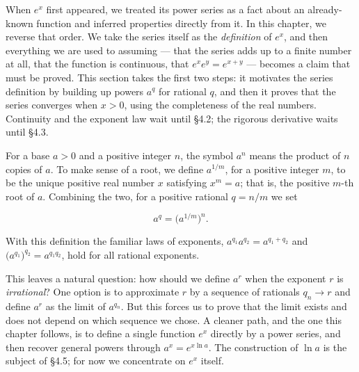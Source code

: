 \documentclass[a4paper,12pt,oneside]{memoir}
\begin{document}
When \(e^{x}\) first appeared, we treated its power series as a fact about an already-known function and inferred properties directly from it. In this chapter, we reverse that order. We take the series itself as the \emph{definition} of \(e^{x}\), and then everything we are used to assuming — that the series adds up to a finite number at all, that the function is continuous, that \(e^{x} e^{y} = e^{x + y}\) — becomes a claim that must be proved. This section takes the first two steps: it motivates the series definition by building up powers \(a^{q}\) for rational \(q\), and then it proves that the series converges when \(x > 0\), using the completeness of the real numbers. Continuity and the exponent law wait until §4.2; the rigorous derivative waits until §4.3.

For a base \(a > 0\) and a positive integer \(n\), the symbol \(a^{n}\) means the product of \(n\) copies of \(a\). To make sense of a root, we define \(a^{1/m}\), for a positive integer \(m\), to be the unique positive real number \(x\) satisfying \(x^{m} = a\); that is, the positive \(m\)-th root of \(a\). Combining the two, for a positive rational \(q = n/m\) we set

\[ a^{q} = \bigl(a^{1/m}\bigr)^{n}. \]

With this definition the familiar laws of exponents, \(a^{q_{1}} a^{q_{2}} = a^{q_{1} + q_{2}}\) and \(\bigl(a^{q_{1}}\bigr)^{q_{2}} = a^{q_{1} q_{2}}\), hold for all rational exponents.

This leaves a natural question: how should we define \(a^{r}\) when the exponent \(r\) is \emph{irrational}? One option is to approximate \(r\) by a sequence of rationals \(q_{n} \to r\) and define \(a^{r}\) as the limit of \(a^{q_{n}}\). But this forces us to prove that the limit exists and does not depend on which sequence we chose. A cleaner path, and the one this chapter follows, is to define a single function \(e^{x}\) directly by a power series, and then recover general powers through \(a^{x} = e^{x \ln a}\). The construction of \(\ln a\) is the subject of §4.5; for now we concentrate on \(e^{x}\) itself.
\end{document}
